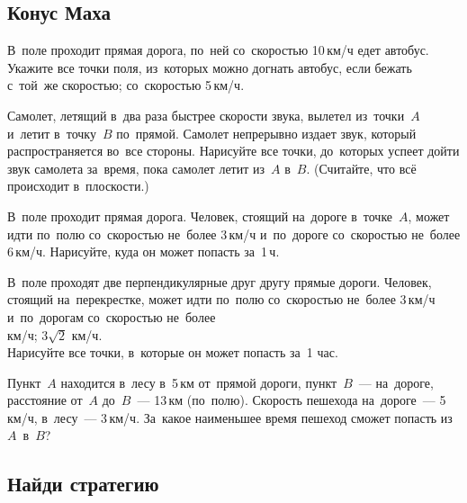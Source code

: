 


\subsection*{Конус Маха}

\begin{problems}

\item
В~поле проходит прямая дорога, по~ней со~скоростью 10\,км/ч едет автобус.
Укажите все точки поля, из~которых можно догнать автобус, если бежать
\\
\subproblem с~той~же скоростью;
\subproblem со~скоростью 5\,км/ч.

\item
Самолет, летящий в~два раза быстрее скорости звука, вылетел из~точки~$A$
и~летит в~точку~$B$ по~прямой.
Самолет непрерывно издает звук, который распространяется во~все стороны.
Нарисуйте все точки, до~которых успеет дойти звук самолета за~время, пока
самолет летит из~$A$ в~$B$.
(Считайте, что всё происходит в~плоскости.)

\item
В~поле проходит прямая дорога.
Человек, стоящий на~дороге в~точке~$A$, может идти по~полю со~скоростью
не~более 3\,км/ч и~по~дороге со~скоростью не~более 6\,км/ч.
Нарисуйте, куда он может попасть за~1\,ч.

\item
В~поле проходят две перпендикулярные друг другу прямые дороги.
Человек, стоящий на~перекрестке, может идти по~полю со~скоростью не~более
3\,км/ч и~по~дорогам со~скоростью не~более
\\
 км/ч;
\qquad
\subproblem $3\sqrt2$ км/ч.
\\
Нарисуйте все точки, в~которые он может попасть за~1 час.

\item
Пункт~$A$ находится в~лесу в~5\,км от~прямой дороги, пункт~$B$~--- на~дороге,
расстояние от~$A$ до~$B$~--- 13\,км (по~полю).
Скорость пешехода на~дороге~--- 5\,км/ч, в~лесу~--- 3\,км/ч.
За~какое наименьшее время пешеход сможет попасть из~$A$~в~$B$?

\end{problems}

\subsection*{Найди стратегию}

